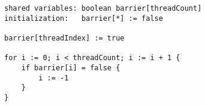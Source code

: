\begin{lstlisting}[mathescape]
shared variables: boolean barrier[threadCount]
initialization:   barrier[*] := false

barrier[threadIndex] := true

for i := 0; i < threadCount; i := i + 1 {
	if barrier[i] = false {
		i := -1
	}
}
\end{lstlisting}
